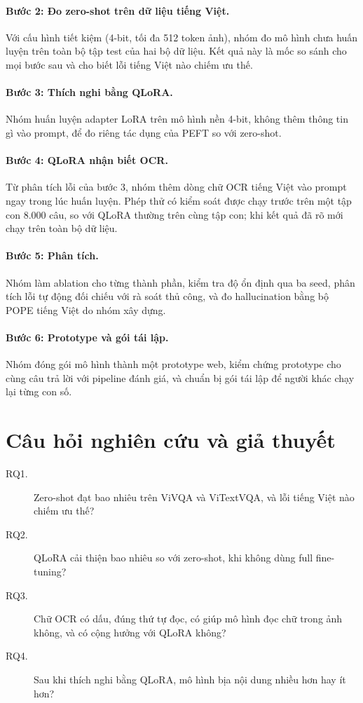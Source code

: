 \paragraph{Bước 2: Đo zero-shot trên dữ liệu tiếng Việt.} Với cấu hình tiết kiệm
(4-bit, tối đa 512 token ảnh), nhóm đo mô hình chưa huấn luyện trên toàn bộ tập
test của hai bộ dữ liệu. Kết quả này là mốc so sánh cho mọi bước sau và cho biết
lỗi tiếng Việt nào chiếm ưu thế.

\paragraph{Bước 3: Thích nghi bằng QLoRA.} Nhóm huấn luyện adapter LoRA trên mô
hình nền 4-bit, không thêm thông tin gì vào prompt, để đo riêng tác dụng của
PEFT so với zero-shot.

\paragraph{Bước 4: QLoRA nhận biết OCR.} Từ phân tích lỗi của bước 3, nhóm thêm
dòng chữ OCR tiếng Việt vào prompt ngay trong lúc huấn luyện. Phép thử có kiểm
soát được chạy trước trên một tập con 8.000 câu, so với QLoRA thường trên cùng
tập con; khi kết quả đã rõ mới chạy trên toàn bộ dữ liệu.

\paragraph{Bước 5: Phân tích.} Nhóm làm ablation cho từng thành phần, kiểm tra
độ ổn định qua ba seed, phân tích lỗi tự động đối chiếu với rà soát thủ công, và đo
hallucination bằng bộ POPE tiếng Việt do nhóm xây dựng.

\paragraph{Bước 6: Prototype và gói tái lập.} Nhóm đóng gói mô hình thành một
prototype web, kiểm chứng prototype cho cùng câu trả lời với pipeline đánh giá, và
chuẩn bị gói tái lập để người khác chạy lại từng con số.

\section{Câu hỏi nghiên cứu và giả thuyết}
\label{sec:intro-rq}

\begin{description}
  \item[RQ1.] Zero-shot đạt bao nhiêu trên ViVQA và ViTextVQA, và lỗi tiếng Việt
  nào chiếm ưu thế?
  \item[RQ2.] QLoRA cải thiện bao nhiêu so với zero-shot, khi không dùng full
  fine-tuning?
  \item[RQ3.] Chữ OCR có dấu, đúng thứ tự đọc, có giúp mô hình đọc chữ trong ảnh
  không, và có cộng hưởng với QLoRA không?
  \item[RQ4.] Sau khi thích nghi bằng QLoRA, mô hình bịa nội dung nhiều hơn hay
  ít hơn?
\end{description}

